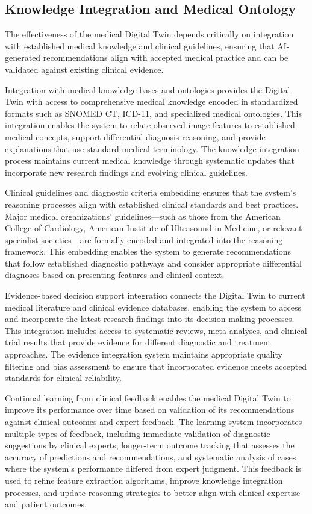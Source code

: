 \subsection{Knowledge Integration and Medical Ontology}

The effectiveness of the medical Digital Twin depends critically on integration with established medical knowledge and clinical guidelines, ensuring that AI-generated recommendations align with accepted medical practice and can be validated against existing clinical evidence.

Integration with medical knowledge bases and ontologies provides the Digital Twin with access to comprehensive medical knowledge encoded in standardized formats such as SNOMED CT, ICD-11, and specialized medical ontologies. This integration enables the system to relate observed image features to established medical concepts, support differential diagnosis reasoning, and provide explanations that use standard medical terminology. The knowledge integration process maintains current medical knowledge through systematic updates that incorporate new research findings and evolving clinical guidelines.

Clinical guidelines and diagnostic criteria embedding ensures that the system's reasoning processes align with established clinical standards and best practices. Major medical organizations' guidelines—such as those from the American College of Cardiology, American Institute of Ultrasound in Medicine, or relevant specialist societies—are formally encoded and integrated into the reasoning framework. This embedding enables the system to generate recommendations that follow established diagnostic pathways and consider appropriate differential diagnoses based on presenting features and clinical context.

Evidence-based decision support integration connects the Digital Twin to current medical literature and clinical evidence databases, enabling the system to access and incorporate the latest research findings into its decision-making processes. This integration includes access to systematic reviews, meta-analyses, and clinical trial results that provide evidence for different diagnostic and treatment approaches. The evidence integration system maintains appropriate quality filtering and bias assessment to ensure that incorporated evidence meets accepted standards for clinical reliability.

Continual learning from clinical feedback enables the medical Digital Twin to improve its performance over time based on validation of its recommendations against clinical outcomes and expert feedback. The learning system incorporates multiple types of feedback, including immediate validation of diagnostic suggestions by clinical experts, longer-term outcome tracking that assesses the accuracy of predictions and recommendations, and systematic analysis of cases where the system's performance differed from expert judgment. This feedback is used to refine feature extraction algorithms, improve knowledge integration processes, and update reasoning strategies to better align with clinical expertise and patient outcomes.

